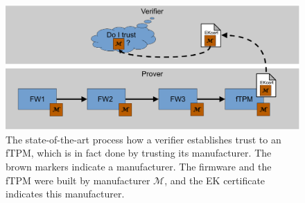\begin{figure}[htpb]
  \centering
  \includegraphics[width=1\linewidth]{figures/current_state.pdf}
  \caption{The state-of-the-art process how a verifier establishes trust to an \ac{fTPM}, which is in fact done by trusting its manufacturer. The brown markers indicate a manufacturer. The firmware and the fTPM were built by manufacturer $\mathcal{M}$, and the EK certificate indicates this manufacturer.} \label{fig:current_state}
\end{figure}

